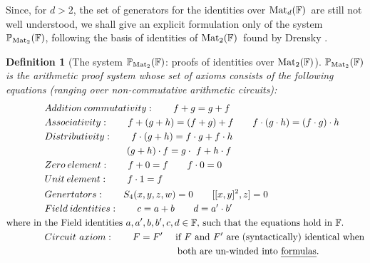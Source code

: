 \documentclass[12pt,reqno]{article}
\newtheorem{definition}{Definition}
\newcommand\F{\ensuremath{\mathbb F}}
\newcommand\PP{{\mathbb P}}
\newcommand\PMtwo{\ensuremath{\PP_{{\rm Mat}_2}(\F)}}
\newcommand{\cd}{\cdot}
\newcommand{\matd}{{\ensuremath{{\rm Mat}_d(\F)}}}
\newcommand{\mattwo}{{\ensuremath{{\rm Mat}_2(\F)}}}
\begin{document}
Since, for $d>2$, the set of generators for the identities over \matd\ are still not well understood, we shall give an explicit formulation only of the system   $\PMtwo$, following the basis of identities of \mattwo\ found by  Drensky \cite{Dre81}.
\begin{definition}[The system $\PMtwo$: proofs of  identities over $\mattwo$]
$\PMtwo$ is the arithmetic proof system whose set of  axioms consists of the following equations (ranging over non-commutative arithmetic circuits):
\begin{align*}
&Addition\: commutativity: \qquad f+g=g+f\\
&Associativity:\qquad   f+(g+h)=(f+g)+f \qquad f\cdot(g\cdot h)=(f\cdot g)\cdot h\\
&Distributivity:\qquad f\cdot(g+h)=f\cdot g+f\cdot h\\
&~~~~~~~~~~~~~~~~~~~~\qquad (g+h)\cdot f= g\cd\ f +h\cdot f\\
&Zero \:element: \qquad f+0=f \qquad f\cdot 0=0\\
&Unit \:element:\qquad f\cdot 1 =f \\
&Genertators:  \qquad S_4(x,y,z,w)=0  \qquad  [[x,y]^2,z]=0\\
&Field \:identities: \qquad c=a+b \qquad d= a'\cdot b'\\
\text{where in } &\text{the Field identities $a,a',b,b',c,d\in \F$, such that the equations hold in $\F$.} \\
&Circuit \ axiom:\qquad F=F'
\text{~~~~if $F$ and $F'$ are (syntactically) identical when} \\
&~~~~~~~~~~~~~~~~~~~~~~~~~~~~~~~~~~~~~~~~~~\text{both are un-winded into \emph{formulas}.}
\end{align*}
\end{definition}
\end{document}
